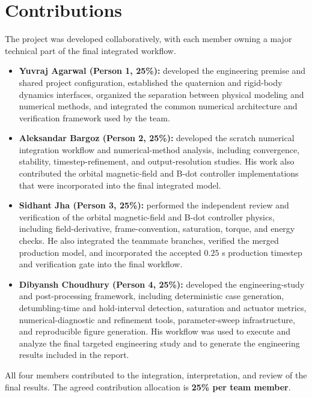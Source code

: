 \section{Contributions}

The project was developed collaboratively, with each member owning a major technical part of the final integrated workflow.

\begin{itemize}

\item \textbf{Yuvraj Agarwal (Person 1, 25\%):} developed the engineering premise and shared project configuration, established the quaternion and rigid-body dynamics interfaces, organized the separation between physical modeling and numerical methods, and integrated the common numerical architecture and verification framework used by the team.

\item \textbf{Aleksandar Bargoz (Person 2, 25\%):} developed the scratch numerical integration workflow and numerical-method analysis, including convergence, stability, timestep-refinement, and output-resolution studies. His work also contributed the orbital magnetic-field and B-dot controller implementations that were incorporated into the final integrated model.

\item \textbf{Sidhant Jha (Person 3, 25\%):} performed the independent review and verification of the orbital magnetic-field and B-dot controller physics, including field-derivative, frame-convention, saturation, torque, and energy checks. He also integrated the teammate branches, verified the merged production model, and incorporated the accepted $0.25$ s production timestep and verification gate into the final workflow.

\item \textbf{Dibyansh Choudhury (Person 4, 25\%):} developed the engineering-study and post-processing framework, including deterministic case generation, detumbling-time and hold-interval detection, saturation and actuator metrics, numerical-diagnostic and refinement tools, parameter-sweep infrastructure, and reproducible figure generation. His workflow was used to execute and analyze the final targeted engineering study and to generate the engineering results included in the report.

\end{itemize}

All four members contributed to the integration, interpretation, and review of the final results. The agreed contribution allocation is \textbf{25\% per team member}.

